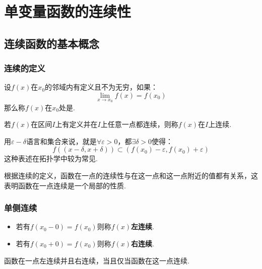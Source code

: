 \chapter{单变量函数的连续性}
\section{连续函数的基本概念}
\subsection{连续的定义}
\begin{definition}
    设$f(x)$在$x_0$的邻域内有定义且不为无穷，如果：
    \[\lim_{x\to x_0}f(x) = f(x_0)\]
    那么称$f(x)$在$x_0$处是.

    若$f(x)$在区间$I$上有定义并在$I$上任意一点都连续，则称$f(x)$在$I$上连续.
\end{definition}

用$\varepsilon-\delta$语言和集合来说，就是$\forall \varepsilon>0$，都$\exists \delta>0$使得：
\[f\left((x-\delta, x+\delta)\right) \subset \left(f(x_0)-\varepsilon, f(x_0)+\varepsilon\right)\]
这种表述在拓扑学中较为常见.

根据连续的定义，函数在一点的连续性与在这一点和这一点附近的值都有关系，这表明函数在一点连续是一个局部的性质.

\subsection{单侧连续}
\begin{definition}
    \begin{itemize}
        \item 若有$f(x_0-0)=f(x_0)$则称$f(x)$\textbf{左连续}.
        \item 若有$f(x_0+0)=f(x_0)$则称$f(x)$\textbf{右连续}.
    \end{itemize}
\end{definition}

\begin{theorem}
    函数在一点左连续并且右连续，当且仅当函数在这一点连续.
\end{theorem}


